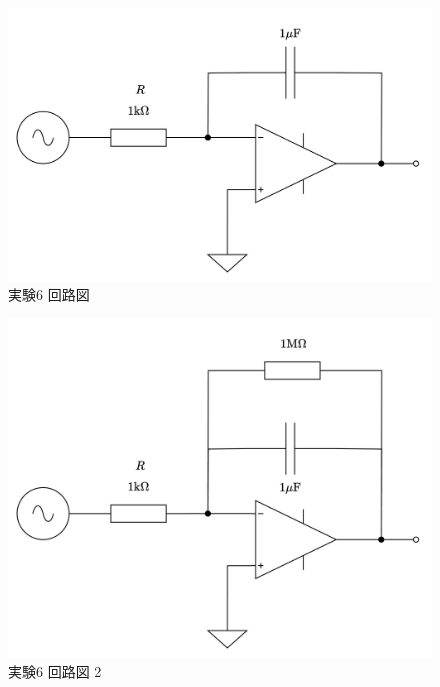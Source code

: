 \begin{figure}[!htb]
    \centering
    \includegraphics[width=0.6\linewidth]{src/figures/exp6/circuit.png}
    \caption{実験6 回路図}\label{fig:exp6-circuit}
\end{figure}

\begin{figure}[!htb]
    \centering
    \includegraphics[width=0.6\linewidth]{src/figures/exp6/circuit2.png}
    \caption{実験6 回路図 2}\label{fig:exp6-circuit-2}
\end{figure}

